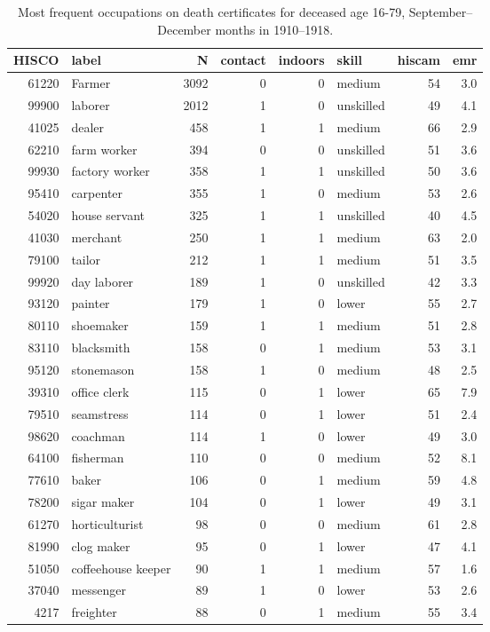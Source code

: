 \begin{table}[h!]
\centering
\begin{tabular}{rlrrrlrr}
  \hline
HISCO & label & N & contact & indoors & skill & hiscam & emr \\ 
  \hline
61220 & Farmer & 3092 &  0 &  0 & medium & 54 & 3.0 \\ 
  99900 & laborer & 2012 &  1 &  0 & unskilled & 49 & 4.1 \\ 
  41025 & dealer & 458 &  1 &  1 & medium & 66 & 2.9 \\ 
  62210 & farm worker & 394 &  0 &  0 & unskilled & 51 & 3.6 \\ 
  99930 & factory worker & 358 &  1 &  1 & unskilled & 50 & 3.6 \\ 
  95410 & carpenter & 355 &  1 &  0 & medium & 53 & 2.6 \\ 
  54020 & house servant & 325 &  1 &  1 & unskilled & 40 & 4.5 \\ 
  41030 & merchant & 250 &  1 &  1 & medium & 63 & 2.0 \\ 
  79100 & tailor & 212 &  1 &  1 & medium & 51 & 3.5 \\ 
  99920 & day laborer & 189 &  1 &  0 & unskilled & 42 & 3.3 \\ 
  93120 & painter & 179 &  1 &  0 & lower & 55 & 2.7 \\ 
  80110 & shoemaker & 159 &  1 &  1 & medium & 51 & 2.8 \\ 
  83110 & blacksmith & 158 &  0 &  1 & medium & 53 & 3.1 \\ 
  95120 & stonemason & 158 &  1 &  0 & medium & 48 & 2.5 \\ 
  39310 & office clerk & 115 &  0 &  1 & lower & 65 & 7.9 \\ 
  79510 & seamstress & 114 &  0 &  1 & lower & 51 & 2.4 \\ 
  98620 & coachman & 114 &  1 &  0 & lower & 49 & 3.0 \\ 
  64100 & fisherman & 110 &  0 &  0 & medium & 52 & 8.1 \\ 
  77610 & baker & 106 &  0 &  1 & medium & 59 & 4.8 \\ 
  78200 & sigar maker & 104 &  0 &  1 & lower & 49 & 3.1 \\ 
  61270 & horticulturist & 98 &  0 &  0 & medium & 61 & 2.8 \\ 
  81990 & clog maker & 95 &  0 &  1 & lower & 47 & 4.1 \\ 
  51050 & coffeehouse keeper & 90 &  1 &  1 & medium & 57 & 1.6 \\ 
  37040 & messenger & 89 &  1 &  0 & lower & 53 & 2.6 \\ 
  4217 & freighter & 88 &  0 &  1 & medium & 55 & 3.4 \\ 
   \hline
\end{tabular}
\caption{Most frequent occupations on death certificates for deceased age 16-79, September--December months in 1910--1918.} 
\label{tab:topoccs_selected}
\end{table}
